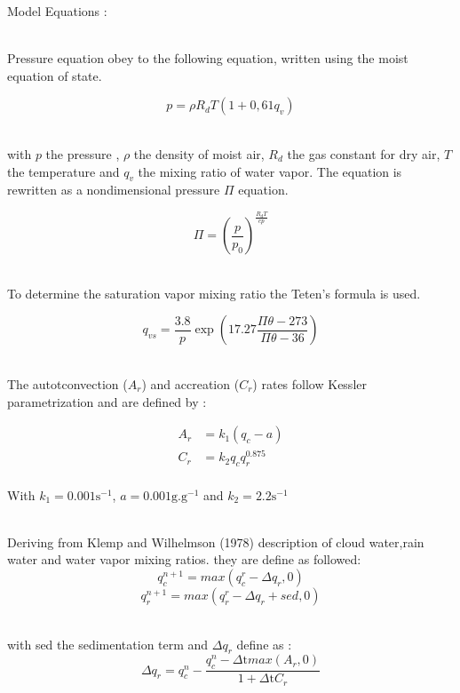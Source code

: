 \documentclass{article}
\begin{document}
Model Equations :

~\\Pressure equation obey to the following equation, written using the moist equation of state.

\begin{equation}
p=\rho R_dT(1+0,61q_v)
\end{equation}

~\\ with $p$ the pressure , $\rho$ the density of moist air, $R_d$ the gas constant for dry air, $T$ the temperature and $q_v$ the mixing ratio of water vapor. The equation is rewritten as a nondimensional pressure $\Pi$ equation.

\begin{equation}
\Pi=\left(\frac{p}{p_0}\right)^{\frac{R_dT}{cp}}
\end{equation}


~\\To determine the saturation vapor mixing ratio the Teten's formula is used.

\begin{equation}
q_{vs}=\frac{3.8}{p}\exp\left(17.27\frac{\Pi \theta-273}{\Pi \theta-36}\right)
\end {equation}



~\\The autotconvection ($A_r$) and accreation ($C_r$) rates follow Kessler parametrization and are defined by :

\begin{equation}
\begin{split}
A_r&=k_1(q_c-a) \\
C_r&=k_2q_cq_r^{0.875}
\end{split}
\end{equation}
~\\ With $k_1=0.001 \text{s}^{-1}$, $a=0.001 \text{g}.\text{g}^{-1}$ and $k_2=2.2 \text{s}^{-1}$ 

~\\ Deriving from Klemp and Wilhelmson (1978) description of cloud water,rain water and water vapor mixing ratios. they are define as followed:
\begin{equation}
q_c^{n+1}=max(q_c^r-\Delta q_r,0)
\end{equation}
\begin{equation}
q_r^{n+1}=max(q_r^r-\Delta q_r+sed,0)
\end{equation}

~\\with sed the sedimentation term and $\Delta q_r$ define as :
\begin{equation}
\Delta q_r=q_c^n-\frac{q_c^n-\Delta \text{t} max(A_r,0)}{1+\Delta \text{t} C_r}
\end{equation}
\end{document}
